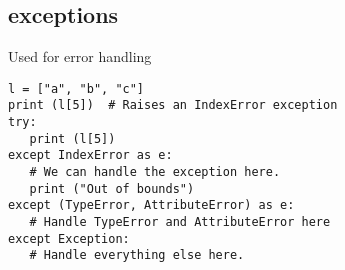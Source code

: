 \subsection{exceptions}
Used for error handling

\begin{lstlisting}
l = ["a", "b", "c"]
print (l[5])  # Raises an IndexError exception
try:
   print (l[5])
except IndexError as e:
   # We can handle the exception here. 
   print ("Out of bounds")
except (TypeError, AttributeError) as e:
   # Handle TypeError and AttributeError here
except Exception:
   # Handle everything else here.
\end{lstlisting}

